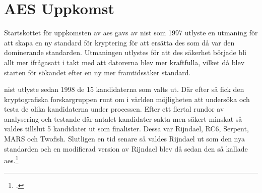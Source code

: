 \section{AES Uppkomst} %
\label{sec:aes-uppkomst}
Startskottet för uppkomsten av \acrshort{aes} gavs av \acrfull{nist} som 1997
utlyste en utmaning för att skapa en ny standard för kryptering för att ersätta
\acrshort{des} som då var den dominerande standarden. Utmaningen utlystes för att
\acrshort{des} säkerhet började bli allt mer ifrågasatt i takt med att datorerna blev mer kraftfulla, vilket då blev starten för sökandet efter
en ny mer framtidssäker standard.

\acrshort{nist} utlyste sedan 1998 de 15 kandidaterna som valts ut. Där efter så fick
den kryptografiska forskargruppen runt om i världen möjligheten att undersöka och testa
de olika kandidaterna under processen. Efter ett flertal rundor av analysering och testande
där antalet kandidater sakta men säkert minskat så valdes tillslut 5 kandidater ut som
finalister. Dessa var Rijndael, RC6, Serpent, MARS och Twofish. Slutligen en tid senare så
valdes Rijndael ut som den nya standarden och en modifierad version av Rijndael
blev då sedan den så kallade \acrfull{aes}.\footcite{nechvatal2001report}

